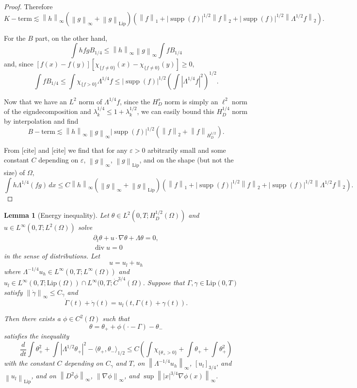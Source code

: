 \documentclass[11pt]{amsart}
\newtheorem{lemma}[theorem]{Lemma}
\theoremstyle{remark}
\theoremstyle{definition}
\newcommand{\eps}{\varepsilon}
\newcommand{\chevron}[1]{\langle #1 \rangle}
\newcommand{\norm}[1]{\left\lVert#1\right\rVert}
\newcommand{\paren}[1]{\left( #1 \right)}
\newcommand{\bracket}[1]{\left[ #1 \right]}
\newcommand{\abs}[1]{\left\lvert #1 \right\rvert}
\DeclareMathOperator{\supp}{supp}
\newcommand{\del}{\partial}
\newcommand{\grad}{\nabla}
\newcommand{\ddt}{\frac{d}{dt}}
\renewcommand{\div}{\operatorname{div}}
\newcommand{\Lip}{\text{Lip}}
\newcommand{\indic}[1]{\chi_{\{#1\}}}
\newcommand{\ulow}{u_l}
\newcommand{\uhigh}{u_h}
\begin{document}
\begin{proof}
Therefore 
\[ K-\textrm{term} \lesssim \norm{h}_\infty \paren{\norm{g}_\infty+\norm{g}_\Lip} \paren{ \norm{f}_1 + |\supp(f)|^{1/2} \norm{f}_2 + |\supp(f)|^{1/2} \norm{\Lambda^{1/2}f}_2}. \]

For the $B$ part, on the other hand, 
\[ \int h f g B_{1/4} \leq \norm{h}_\infty \norm{g}_\infty \int f B_{1/4} \]
and, since $[f(x)-f(y)][\indic{f\neq0}(x)-\indic{f\neq0}(y)] \geq 0$,
\[ \int f B_{1/4} \leq \int \indic{f>0} \Lambda^{1/4} f \leq |\supp(f)|^{1/2} \paren{\int \abs{\Lambda^{1/4} f}^2}^{1/2}. \]

Now that we have an $L^2$ norm of $\Lambda^{1/4} f$, since the $H^s_D$ norm is simply an $\ell^2$ norm of the eigndecomposition and $\lambda_k^{1/4} \leq 1 + \lambda_k^{1/2}$, we can easily bound this $H^{1/4}_D$ norm by interpolation and find
\[ B-\textrm{term} \lesssim \norm{h}_\infty \norm{g}_\infty |\supp(f)|^{1/2} \paren{\norm{f}_2 + \norm{f}_{H_D^{1/2}}}. \]

From [cite] and [cite] we find that for any $\eps > 0$ arbitrarily small and some constant $C$ depending on $\eps$, $\norm{g}_\infty$, $\norm{g}_\Lip$, and on the shape (but not the size) of $\Omega$,
\[ \int h \Lambda^{1/4} (fg) \,dx \leq C \norm{h}_\infty \paren{\norm{g}_\infty+\norm{g}_\Lip} \paren{ \norm{f}_1 + |\supp(f)|^{1/2} \norm{f}_2 + |\supp(f)|^{1/2} \norm{\Lambda^{1/2}f}_2}. \]
\end{proof}

\begin{lemma}[Energy inequality] \label{thm:energy inequality}
Let $\theta \in L^2(0,T; H_D^{1/2}(\Omega))$ and $u \in L^\infty(0,T; L^2(\Omega))$ solve
\begin{align*}
\del_t \theta + u\cdot \grad \theta + \Lambda \theta = 0,
\\ \div u = 0
\end{align*}
in the sense of distributions.  Let
\[ u = \ulow + \uhigh \]
where $\Lambda^{-1/4} \uhigh \in L^\infty(0,T; L^\infty(\Omega))$ and $\ulow \in L^\infty(0,T; \Lip(\Omega)) \cap L^\infty(0,T; \dot{C}^{3/4}(\Omega)$.  
Suppose that $\Gamma, \gamma \in \Lip(0,T)$ satisfy $\norm{\dot{\gamma}}_\infty \leq C_\gamma$ and
\[ \dot{\Gamma}(t) + \dot{\gamma}(t) = \ulow(t, \Gamma(t) + \gamma(t)). \]

Then there exists a $\phi \in C^2(\Omega)$ such that
\[ \theta = \theta_+ + \phi(\cdot-\Gamma) - \theta_- \]
satisfies the inequality
\[ \ddt \int \theta_+^2 + \int \abs{\Lambda^{1/2} \theta_+}^2 - \chevron{\theta_+,\theta_-}_{1/2} \leq C \paren{ \int \indic{\theta_+ > 0} + \int \theta_+ + \int \theta_+^2 } \]
with the constant $C$ depending on $C_\gamma$ and $T$, on $\norm{\Lambda^{-1/4} \uhigh}_\infty$, $\bracket{\ulow}_{3/4}$, and $\norm{\ulow}_\Lip$, and on $\norm{D^2 \phi}_\infty$, $\norm{\grad\phi}_\infty$, and $\sup \norm{|x|^{3/4} \grad\phi(x)}_\infty$.  
\end{lemma}
\end{document}
